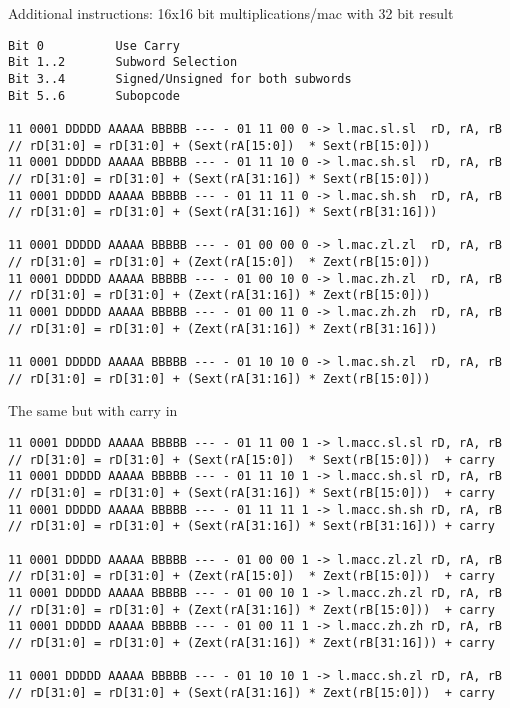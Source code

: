 \begin{landscape}
Additional instructions: 16x16 bit multiplications/mac with 32 bit result

\begin{verbatim}
Bit 0          Use Carry
Bit 1..2       Subword Selection
Bit 3..4       Signed/Unsigned for both subwords
Bit 5..6       Subopcode

11 0001 DDDDD AAAAA BBBBB --- - 01 11 00 0 -> l.mac.sl.sl  rD, rA, rB   // rD[31:0] = rD[31:0] + (Sext(rA[15:0])  * Sext(rB[15:0]))
11 0001 DDDDD AAAAA BBBBB --- - 01 11 10 0 -> l.mac.sh.sl  rD, rA, rB   // rD[31:0] = rD[31:0] + (Sext(rA[31:16]) * Sext(rB[15:0]))
11 0001 DDDDD AAAAA BBBBB --- - 01 11 11 0 -> l.mac.sh.sh  rD, rA, rB   // rD[31:0] = rD[31:0] + (Sext(rA[31:16]) * Sext(rB[31:16]))

11 0001 DDDDD AAAAA BBBBB --- - 01 00 00 0 -> l.mac.zl.zl  rD, rA, rB   // rD[31:0] = rD[31:0] + (Zext(rA[15:0])  * Zext(rB[15:0]))
11 0001 DDDDD AAAAA BBBBB --- - 01 00 10 0 -> l.mac.zh.zl  rD, rA, rB   // rD[31:0] = rD[31:0] + (Zext(rA[31:16]) * Zext(rB[15:0]))
11 0001 DDDDD AAAAA BBBBB --- - 01 00 11 0 -> l.mac.zh.zh  rD, rA, rB   // rD[31:0] = rD[31:0] + (Zext(rA[31:16]) * Zext(rB[31:16]))

11 0001 DDDDD AAAAA BBBBB --- - 01 10 10 0 -> l.mac.sh.zl  rD, rA, rB   // rD[31:0] = rD[31:0] + (Sext(rA[31:16]) * Zext(rB[15:0]))
\end{verbatim}

\clearpage
The same but with carry in
{\small
\begin{verbatim}
11 0001 DDDDD AAAAA BBBBB --- - 01 11 00 1 -> l.macc.sl.sl rD, rA, rB   // rD[31:0] = rD[31:0] + (Sext(rA[15:0])  * Sext(rB[15:0]))  + carry
11 0001 DDDDD AAAAA BBBBB --- - 01 11 10 1 -> l.macc.sh.sl rD, rA, rB   // rD[31:0] = rD[31:0] + (Sext(rA[31:16]) * Sext(rB[15:0]))  + carry
11 0001 DDDDD AAAAA BBBBB --- - 01 11 11 1 -> l.macc.sh.sh rD, rA, rB   // rD[31:0] = rD[31:0] + (Sext(rA[31:16]) * Sext(rB[31:16])) + carry

11 0001 DDDDD AAAAA BBBBB --- - 01 00 00 1 -> l.macc.zl.zl rD, rA, rB   // rD[31:0] = rD[31:0] + (Zext(rA[15:0])  * Zext(rB[15:0]))  + carry
11 0001 DDDDD AAAAA BBBBB --- - 01 00 10 1 -> l.macc.zh.zl rD, rA, rB   // rD[31:0] = rD[31:0] + (Zext(rA[31:16]) * Zext(rB[15:0]))  + carry
11 0001 DDDDD AAAAA BBBBB --- - 01 00 11 1 -> l.macc.zh.zh rD, rA, rB   // rD[31:0] = rD[31:0] + (Zext(rA[31:16]) * Zext(rB[31:16])) + carry

11 0001 DDDDD AAAAA BBBBB --- - 01 10 10 1 -> l.macc.sh.zl rD, rA, rB   // rD[31:0] = rD[31:0] + (Sext(rA[31:16]) * Zext(rB[15:0]))  + carry
\end{verbatim}}


\end{landscape}
